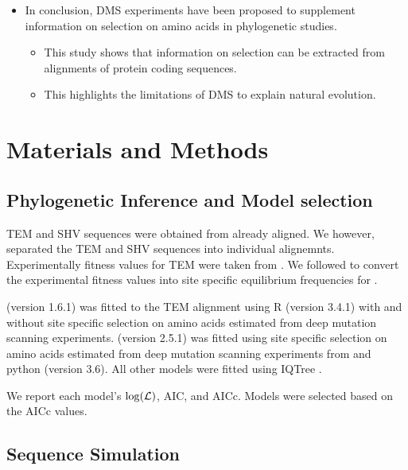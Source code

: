 \documentclass[12pt]{article}
\begin{document}
\begin{itemize}
	\item In conclusion, DMS experiments have been proposed to supplement information on selection on amino acids in phylogenetic studies.
	\begin{itemize}
		\item This study shows that information on selection can be extracted from alignments of protein coding sequences.
		\item This highlights the limitations of DMS to explain natural evolution.
	\end{itemize}
\end{itemize}


\section*{Materials and Methods}

\subsection*{Phylogenetic Inference and Model selection}

TEM and SHV sequences were obtained from \citet{bloom2017} already aligned.
We however, separated the TEM and SHV sequences into individual alignemnts.
Experimentally fitness values for TEM were taken from \citet{stiffler2016}.
We followed \citep{bloom2017} to convert the experimental fitness values into site specific equilibrium frequencies for \phydms. 

\selac (version 1.6.1) was fitted to the TEM alignment using R (version 3.4.1) \citep{rcore} with and without site specific selection on amino acids estimated from deep mutation scanning experiments.
\phydms (version 2.5.1) was fitted using site specific selection on amino acids estimated from deep mutation scanning experiments from \citet{stiffler2016} and python (version 3.6).
All other models were fitted using IQTree \citep{nguyen2015}.

We report each model's $\log(\mathcal{L})$, AIC, and  AICc. 
Models were selected based on the AICc values.

\subsection*{Sequence Simulation}
\end{document}
